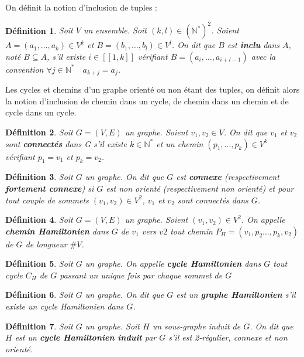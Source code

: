 \documentclass[french,a4paper]{article}
\newtheorem{definition}{Définition}[section]
\begin{document}
On définit la notion d'inclusion de tuples :
\begin{definition}
Soit $V$ un ensemble.
Soit $(k,l) \in (\mathbb{N}^{*})^2$. Soient $A=(a_1,\dots,a_k) \in V^k$ et $B=(b_1,\dots,b_l) \in V^l$. On dit que $B$ est \textbf{inclu} dans $A$, noté $B \subseteq A$, s'il existe $i \in [\![1,k]\!]$ vérifiant $B=(a_i,\dots,a_{i+l-1})$ avec la convention $\forall j \in \mathbb{N}^* \quad a_{k+j}=a_j$.
\end{definition}

Les cycles et chemins d'un graphe orienté ou non étant des tuples, on définit alors la notion d'inclusion de chemin dans un cycle, de chemin dans un chemin et de cycle dans un cycle.

\begin{definition}
Soit $G=(V,E)$ un graphe.
Soient $v_1,v_2 \in V$. On dit que $v_1$ et $v_2$ sont \textbf{connectés} dans G s'il existe $k \in \mathbb{N}^*$ et un chemin $(p_1,\dots,p_k) \in V^k$ vérifiant $p_1=v_1$ et $p_k=v_2$.
\end{definition}

\begin{definition}
Soit $G$ un graphe.
On dit que $G$ est \textbf{connexe} (respectivement \textbf{fortement connexe}) si $G$ est non orienté (respectivement non orienté) et pour tout couple de sommets $(v_1,v_2) \in V^2$, $v_1$ et $v_2$ sont connectés dans $G$.
\end{definition}

\begin{definition}
Soit $G=(V,E)$ un graphe. Soient $(v_1,v_2) \in V^2$.
On appelle \textbf{chemin Hamiltonien} dans $G$ de $v_1$ vers $v2$ tout chemin $P_H=(v_1,p_2\dots,p_k,v_2)$ de $G$ de longueur $\#V$.
\end{definition}

\begin{definition}
Soit $G$ un graphe.
On appelle \textbf{cycle Hamiltonien} dans $G$ tout cycle $C_H$ de $G$ passant un unique fois par chaque sommet de $G$
\end{definition}

\begin{definition}
Soit $G$ un graphe.
On dit que $G$ est un \textbf{graphe Hamiltonien} s'il existe un cycle Hamiltonien dans $G$.
\end{definition}

\begin{definition}
Soit $G$ un graphe.
Soit $H$ un sous-graphe induit de $G$.
On dit que $H$ est un \textbf{cycle Hamiltonien induit} par $G$ s'il est 2-régulier, connexe et non orienté.
\end{definition}
\end{document}
